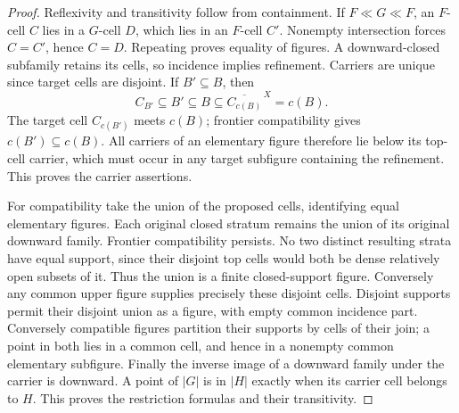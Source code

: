 \begin{proof}
Reflexivity and transitivity follow from containment.
If \(F\ll G\ll F\), an \(F\)-cell \(C\) lies in a
\(G\)-cell \(D\), which lies in an \(F\)-cell \(C'\).
Nonempty intersection forces \(C=C'\), hence \(C=D\).
Repeating proves equality of figures. A downward-closed
subfamily retains its cells, so incidence implies refinement.
Carriers are unique since target cells are disjoint.
If \(B'\subseteq B\), then
\[
 C_{B'}\subseteq B'\subseteq B
 \subseteq\overline{C_{c(B)}}^{\,X}=c(B).
\]
The target cell \(C_{c(B')}\) meets \(c(B)\); frontier
compatibility gives \(c(B')\subseteq c(B)\). All carriers
of an elementary figure therefore lie below its top-cell
carrier, which must occur in any target subfigure containing
the refinement. This proves the carrier assertions.

For compatibility take the union of the proposed cells,
identifying equal elementary figures. Each original closed
stratum remains the union of its original downward family.
Frontier compatibility persists. No two distinct resulting
strata have equal support, since their disjoint top cells
would both be dense relatively open subsets of it.
Thus the union is a finite closed-support figure.
Conversely any common upper figure supplies precisely
these disjoint cells.
Disjoint supports permit their disjoint union as a figure,
with empty common incidence part. Conversely compatible
figures partition their supports by cells of their join;
a point in both lies in a common cell, and hence in a
nonempty common elementary subfigure.
Finally the inverse image of a downward family under
the carrier is downward. A point of \(|G|\) is in \(|H|\)
exactly when its carrier cell belongs to \(H\). This proves
the restriction formulas and their transitivity.
\end{proof}


